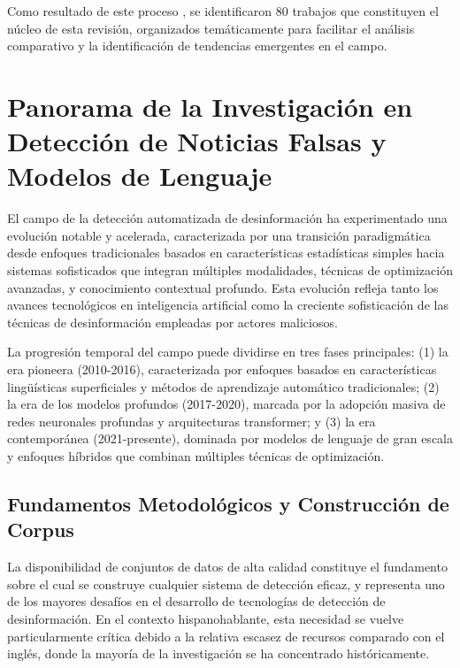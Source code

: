 Como resultado de este proceso , se identificaron 80 trabajos que constituyen el núcleo de esta revisión, organizados temáticamente para facilitar el análisis comparativo y la identificación de tendencias emergentes en el campo.

\section{Panorama de la Investigación en Detección de Noticias Falsas y Modelos de Lenguaje}
\label{sec:panorama_investigacion}

El campo de la detección automatizada de desinformación ha experimentado una evolución notable y acelerada, caracterizada por una transición paradigmática desde enfoques tradicionales basados en características estadísticas simples hacia sistemas sofisticados que integran múltiples modalidades, técnicas de optimización avanzadas, y conocimiento contextual profundo. Esta evolución refleja tanto los avances tecnológicos en inteligencia artificial como la creciente sofisticación de las técnicas de desinformación empleadas por actores maliciosos.

La progresión temporal del campo puede dividirse en tres fases principales: (1) la era pioneera (2010-2016), caracterizada por enfoques basados en características lingüísticas superficiales y métodos de aprendizaje automático tradicionales; (2) la era de los modelos profundos (2017-2020), marcada por la adopción masiva de redes neuronales profundas y arquitecturas transformer; y (3) la era contemporánea (2021-presente), dominada por modelos de lenguaje de gran escala y enfoques híbridos que combinan múltiples técnicas de optimización.

\subsection{Fundamentos Metodológicos y Construcción de Corpus}

La disponibilidad de conjuntos de datos de alta calidad constituye el fundamento sobre el cual se construye cualquier sistema de detección eficaz, y representa uno de los mayores desafíos en el desarrollo de tecnologías de detección de desinformación. En el contexto hispanohablante, esta necesidad se vuelve particularmente crítica debido a la relativa escasez de recursos comparado con el inglés, donde la mayoría de la investigación se ha concentrado históricamente.

